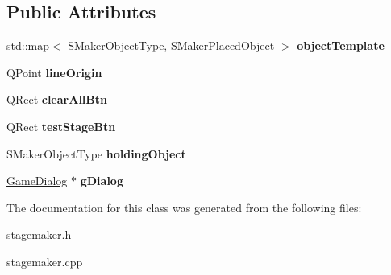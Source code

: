 \subsection*{Public Attributes}
\begin{DoxyCompactItemize}
\item 
\mbox{\label{classgame_1_1StageMaker_a3ff6460868ff3cc0439fec9a2c196f5f}} 
std\+::map$<$ S\+Maker\+Object\+Type, \hyperlink{structgame_1_1SMakerPlacedObject}{S\+Maker\+Placed\+Object} $>$ {\bfseries object\+Template}
\item 
\mbox{\label{classgame_1_1StageMaker_a388399f9012b668f9a04e23589ce0de2}} 
Q\+Point {\bfseries line\+Origin}
\item 
\mbox{\label{classgame_1_1StageMaker_a2274c1b67f7c3b0865c216ce26f89681}} 
Q\+Rect {\bfseries clear\+All\+Btn}
\item 
\mbox{\label{classgame_1_1StageMaker_a2f50a43554a07016d24da52303a3a4f8}} 
Q\+Rect {\bfseries test\+Stage\+Btn}
\item 
\mbox{\label{classgame_1_1StageMaker_a92871f28725f6b66ed40c1a1d91496f8}} 
S\+Maker\+Object\+Type {\bfseries holding\+Object}
\item 
\mbox{\label{classgame_1_1StageMaker_ab8ac20dea0d9f79f56c2b1b6ab225fa7}} 
\hyperlink{classgame_1_1GameDialog}{Game\+Dialog} $\ast$ {\bfseries g\+Dialog}
\end{DoxyCompactItemize}


The documentation for this class was generated from the following files\+:\begin{DoxyCompactItemize}
\item 
stagemaker.\+h\item 
stagemaker.\+cpp\end{DoxyCompactItemize}
